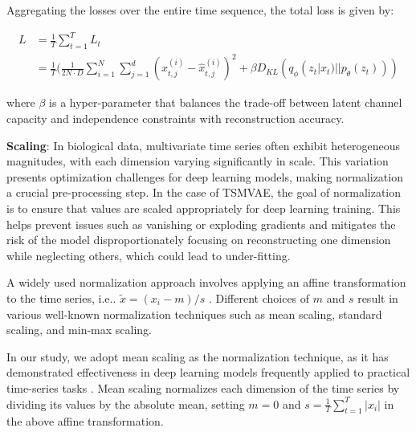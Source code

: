 \documentclass[12pt]{article} %
\begin{document}
Aggregating the losses over the entire time sequence, the total loss is given by:

\begin{align*}
L &= \frac{1}{T}\sum_{t=1}^{T} L_t\\
&= \frac{1}{T}(\frac{1}{2N \cdot D}\sum_{i=1}^{N}\sum_{j=1}^d(x_{t,j}^{(i)} - \hat x_{t,j}^{(i)})^2 + \beta D_{KL}(q_{\phi}(z_{t}|x_{t})||p_{\theta}(z_{t})))
\end{align*}

where $\beta$ is a hyper-parameter that balances the trade-off between latent channel capacity and independence constraints with reconstruction accuracy\citep{higgins2017beta}.


%

\textbf{Scaling}: In biological data, multivariate time series often exhibit heterogeneous magnitudes, with each dimension varying significantly in scale. This variation presents optimization challenges for deep learning models, making normalization a crucial pre-processing step. In the case of TSMVAE, the goal of normalization is to ensure that values are scaled appropriately for deep learning training. This helps prevent issues such as vanishing or exploding gradients and mitigates the risk of the model disproportionately focusing on reconstructing one dimension while neglecting others, which could lead to under-fitting.

A widely used normalization approach involves applying an affine transformation to the time series, i.e.. $\tilde{x} = {(x_i - m)}/{s}$ \citep{rabanser2020effectiveness}\citep{ansari2024chronos}. Different choices of $m$ and $s$ result in  various well-known normalization techniques such as mean scaling, standard scaling, and min-max scaling.

In our study, we adopt mean scaling as the normalization technique, as it has demonstrated effectiveness in deep learning models frequently applied to practical time-series tasks \citep{salinas2020deepar}\citep{rabanser2020effectiveness} \citep{ansari2024chronos}. Mean scaling normalizes each dimension of the time series by dividing its values by the absolute mean, setting $m = 0$ and $s= \frac{1}{T} \sum_{t=1}^{T}|x_i|$ in the above affine transformation. 
\end{document}
